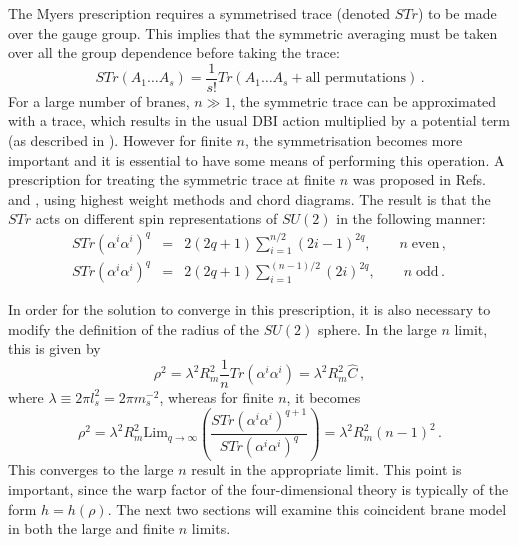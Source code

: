 The Myers prescription requires a symmetrised trace (denoted $STr$) to 
be made over the gauge group. This implies that 
the symmetric averaging must be taken over all the group dependence 
before taking the trace:
% 
\begin{equation}
 \label{eq:str-defn-multi}
 STr (A_1 \ldots A_s) = \frac{1}{s!} Tr(A_1 \ldots A_s + \text{all
permutations})\,.
\end{equation}
% 
For a large number of branes, $n \gg 1$, the symmetric trace can be
approximated with a trace, 
which results in the usual DBI action multiplied by a potential term (as
described in \cite{thomasward, Kachru:2002gs}). 
However for finite $n$, the symmetrisation becomes more important and it
is essential to have some means of performing this operation. A prescription for
treating the symmetric trace at finite $n$ was proposed
in Refs.~\cite{Ramgoolam:2004gw} and \cite{McNamara:2005ry}, 
using highest weight methods and chord diagrams. 
% 
The result is that the $STr$ acts on different spin representations of $SU(2)$ 
in the following manner:
% 
\begin{eqnarray}
\label{eq:str-even-multi}
STr (\alpha^i \alpha^i)^q &=& 2(2q+1)\sum_{i=1}^{n/2}(2i-1)^{2q} , 
\qquad n\; \mathrm{ even}\,, 
\\
\label{eq:str-odd-multi}
STr (\alpha^i \alpha^i)^q &=& 2(2q+1)\sum_{i=1}^{(n-1)/2} (2i)^{2q} , 
\qquad n\; \mathrm{ odd}\,.
\end{eqnarray}
% 


In order for the solution to converge in this prescription, 
it is also necessary to modify the definition of the radius of the 
$SU(2)$ sphere. In the large $n$ limit, this is given by
% 
\begin{equation}
\label{eq:largen-rho-multi}
\rho^2 = \lambda^2 R_m^2 \frac{1}{n} Tr(\alpha^i \alpha^i) = \lambda^2 R_m^2
\hat{C} \,,
\end{equation}
% 
where $\lambda \equiv 2\pi l_s^2 = 2\pi m_s^{-2}$, 
whereas for finite $n$, it becomes
% 
\begin{equation}
\label{eq:finiten-rho-multi}
\rho^2 = \lambda^2 R_m^2 \mathrm{Lim}_{q \to \infty} \left(\frac{STr (\alpha^i
\alpha^i)^{q+1}}{STr(\alpha^i \alpha^i)^q} \right) 
= \lambda^2 R_m^2 (n-1)^2 \,.
\end{equation}
% 
This converges to the large $n$ result in the appropriate limit.
This point is important, since the warp factor 
of the four-dimensional theory is typically of the form $h= h(\rho)$.
% 
The next two sections will examine this coincident brane model in both the
large and finite $n$ limits. 


